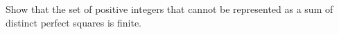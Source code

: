 Show that the set of positive integers that cannot be represented as a sum of distinct perfect squares is finite.
